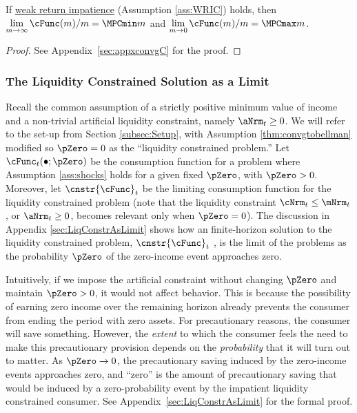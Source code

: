 \documentclass[BufferStockTheory]{subfiles}
\begin{document}
\begin{lemma}\label{lemma:MPCBoundsConvg}
If \hyperlink{WRIC}{weak return impatience} (Assumption \ref{ass:WRIC}) holds, then $\lim\limits_{m\rightarrow \infty} \cFunc (m)/m =\MPCmin m$ and $\lim\limits_{m\rightarrow 0} \cFunc (m)/m =\MPCmax m$.

\end{lemma}
\begin{proof}\let\qed\relax
See Appendix~\ref{sec:appxconvgC} for the proof.

\end{proof}


\hypertarget{The-Liquidity-Constrained-Solution-as-a-Limit}{}
\subsubsection{The Liquidity Constrained Solution as a Limit}\label{subsubsec:deatonIsLimit}

Recall the common assumption \citep{deatonLiqConstr,aiyagari:ge, lsIncFluct, mstIncFluct} of a strictly positive minimum value of income and a non-trivial artificial liquidity constraint, namely $\aNrm_{t}\geq 0$.
We will refer to the set-up from Section \ref{subsec:Setup}, with Assumption \ref{thm:convgtobellman} modified so $\pZero=0$ as the ``liquidity constrained problem.'' Let $\cFunc_{t}(\bullet;\pZero)$ be the consumption function for a problem where Assumption \ref{ass:shocks} holds for a given fixed $\pZero$, with $\pZero>0$.
Moreover, let $\cnstr{\cFunc}_{t}$ be the limiting consumption function for the liquidity constrained problem (note that the liquidity constraint $\cNrm_{t}\leq \mNrm_{t}$, or $\aNrm_{t}\geq 0$, becomes relevant only when $\pZero= 0$).
The discussion in Appendix \ref{sec:LiqConstrAsLimit} shows how an finite-horizon solution to the liquidity constrained problem, $\cnstr{\cFunc}_{t}$ , is the limit of the problems as the probability $\pZero$ of the zero-income event approaches zero.


Intuitively, if we impose the artificial constraint without changing $\pZero$ and maintain $\pZero>0$, it would not affect behavior.
This is because the possibility of earning zero income over the remaining horizon already prevents the consumer from ending the period with zero assets.
For precautionary reasons, the consumer will save something.
However, the \textit{extent} to which the consumer feels the need to make this precautionary provision depends on the \textit{probability} that it will turn out to matter.
As  $\pZero \rightarrow 0$, the   precautionary saving induced by the zero-income events approaches zero, and ``zero'' is the amount of precautionary saving that would be induced by a zero-probability event by the impatient liquidity constrained consumer.
See Appendix~\ref{sec:LiqConstrAsLimit} for the formal proof.
\end{document}
